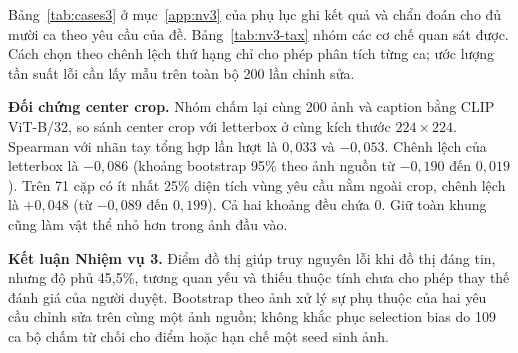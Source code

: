 Bảng~\ref{tab:cases3} ở mục~\ref{app:nv3} của phụ lục ghi kết quả và chẩn đoán cho đủ mười ca theo yêu cầu của đề.
Bảng~\ref{tab:nv3-tax} nhóm các cơ chế quan sát được. Cách chọn theo chênh lệch thứ hạng chỉ cho phép phân tích từng ca; ước lượng tần suất lỗi cần lấy mẫu trên toàn bộ 200 lần chỉnh sửa.

\textbf{Đối chứng center crop.} Nhóm chấm lại cùng 200 ảnh và caption bằng CLIP ViT-B/32, so sánh center crop với letterbox ở cùng kích thước $224\times224$.
Spearman với nhãn tay tổng hợp lần lượt là $0{,}033$ và $-0{,}053$. Chênh lệch của letterbox là $-0{,}086$ (khoảng bootstrap 95\% theo ảnh nguồn từ $-0{,}190$ đến $0{,}019$).
Trên 71 cặp có ít nhất 25\% diện tích vùng yêu cầu nằm ngoài crop, chênh lệch là $+0{,}048$ (từ $-0{,}089$ đến $0{,}199$).
Cả hai khoảng đều chứa 0. Giữ toàn khung cũng làm vật thể nhỏ hơn trong ảnh đầu vào.

\textbf{Kết luận Nhiệm vụ 3.} Điểm đồ thị giúp truy nguyên lỗi khi đồ thị đáng tin,
nhưng độ phủ 45,5\%, tương quan yếu và thiếu thuộc tính chưa cho phép thay thế
đánh giá của người duyệt. Bootstrap theo ảnh xử lý sự phụ thuộc của hai yêu cầu chỉnh sửa trên cùng một ảnh nguồn;
không khắc phục selection bias do 109 ca bộ chấm từ chối cho điểm hoặc hạn chế một seed sinh ảnh.
